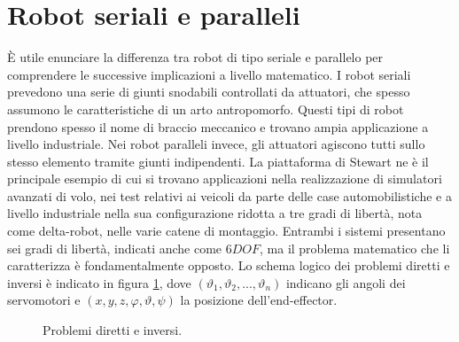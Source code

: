 \documentclass[12pt,twoside,openright]{report}
\begin{document}
\section{Robot seriali e paralleli}\label{robotserialiparalleli}
È utile enunciare la differenza tra robot di tipo seriale e parallelo per comprendere le successive implicazioni a livello matematico. I robot seriali prevedono una serie di giunti snodabili controllati da attuatori, che spesso assumono le caratteristiche di un arto antropomorfo. 
Questi tipi di robot prendono spesso il nome di braccio meccanico e trovano ampia applicazione a livello industriale.
Nei robot paralleli invece, gli attuatori agiscono tutti sullo stesso elemento tramite giunti indipendenti. 
La piattaforma di Stewart ne è il principale esempio di cui si trovano applicazioni nella realizzazione di simulatori avanzati di volo, nei test relativi ai veicoli da parte delle case automobilistiche e a livello industriale nella sua configurazione ridotta a tre gradi di libertà, nota come delta-robot, nelle varie catene di montaggio\cite{bonev2001delta}.
Entrambi i sistemi presentano sei gradi di libertà, indicati anche come $6DOF$, ma il problema matematico che li caratterizza è fondamentalmente opposto.
Lo schema logico dei problemi diretti e inversi è indicato in figura \ref{fig:direttoinverso}, dove $(\vartheta_1,\vartheta_2,...,\vartheta_n)$ indicano gli angoli dei servomotori e $(x,y,z,\varphi,\vartheta,\psi)$ la posizione dell'end-effector.
\begin{figure}[h!]
\centering
{}
\caption{Problemi diretti e inversi.} \label{fig:direttoinverso}
\end{figure}
\end{document}
